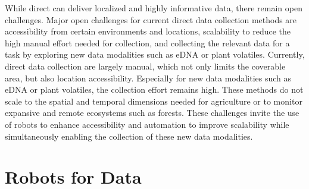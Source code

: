 While direct can deliver localized and highly informative data, there remain open challenges.
Major open challenges for current direct data collection methods are accessibility from certain environments and locations, scalability to reduce the high manual effort needed for collection, and collecting the relevant data for a task by exploring new data modalities such as eDNA or plant volatiles.
Currently, direct data collection are largely manual, which not only limits the coverable area, but also location accessibility. Especially for new data modalities such as eDNA or plant volatiles, the collection effort remains high. These methods do not scale to the spatial and temporal dimensions needed for agriculture or to monitor expansive and remote ecosystems such as forests. These challenges invite the use of robots to enhance accessibility and automation to improve scalability while simultaneously enabling the collection of these new data modalities. %

\section{Robots for Data}


